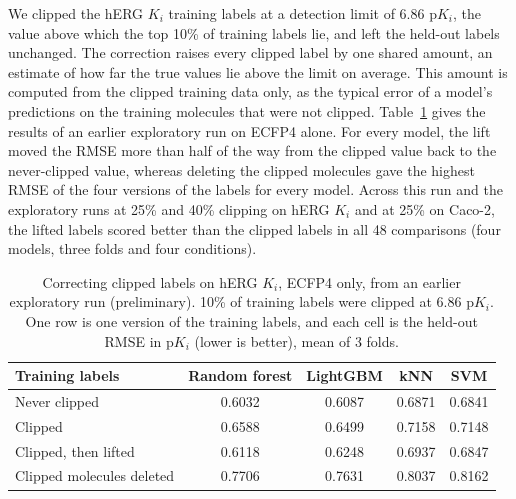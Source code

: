 
We clipped the hERG $K_i$ training labels at a detection limit of 6.86 p$K_i$, the value above which the top 10\% of training labels lie, and left the held-out labels unchanged. The correction raises every clipped label by one shared amount, an estimate of how far the true values lie above the limit on average. This amount is computed from the clipped training data only, as the typical error of a model's predictions on the training molecules that were not clipped. Table~\ref{tab:ch6prelim_censor_ecfp4} gives the results of an earlier exploratory run on ECFP4 alone. For every model, the lift moved the RMSE more than half of the way from the clipped value back to the never-clipped value, whereas deleting the clipped molecules gave the highest RMSE of the four versions of the labels for every model. Across this run and the exploratory runs at 25\% and 40\% clipping on hERG $K_i$ and at 25\% on Caco-2, the lifted labels scored better than the clipped labels in all 48 comparisons (four models, three folds and four conditions).

\begin{table}[htbp]
\centering
\small
\begin{tabular}{@{}lcccc@{}}
\toprule
Training labels & Random forest & LightGBM & kNN & SVM \\
\midrule
Never clipped & 0.6032 & 0.6087 & 0.6871 & 0.6841 \\
Clipped & 0.6588 & 0.6499 & 0.7158 & 0.7148 \\
Clipped, then lifted & 0.6118 & 0.6248 & 0.6937 & 0.6847 \\
Clipped molecules deleted & 0.7706 & 0.7631 & 0.8037 & 0.8162 \\
\bottomrule
\end{tabular}
\caption[Correcting clipped labels on hERG $K_i$, ECFP4 (preliminary).]{Correcting clipped labels on hERG $K_i$, ECFP4 only, from an earlier exploratory run (preliminary). 10\% of training labels were clipped at 6.86 p$K_i$. One row is one version of the training labels, and each cell is the held-out RMSE in p$K_i$ (lower is better), mean of 3 folds.}
\label{tab:ch6prelim_censor_ecfp4}
\end{table}

